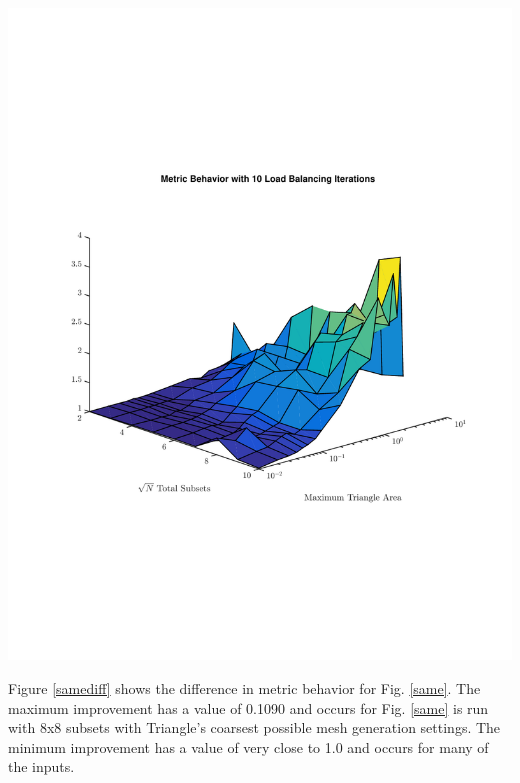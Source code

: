 \noindent\begin{minipage}{\textwidth}
\centering
\includegraphics[scale=0.80, trim = 2cm 6cm 2cm 7cm,clip]{figures/SameIter.pdf}
\label{sameiter}
\end{minipage}
\smallskip

Figure \ref{samediff} shows the difference in metric behavior for Fig. \ref{same}. The maximum improvement has a value of 0.1090 and occurs for Fig. \ref{same} is run with 8x8 subsets with Triangle's coarsest possible mesh generation settings. The minimum improvement has a value of very close to 1.0 and occurs for many of the inputs. 

